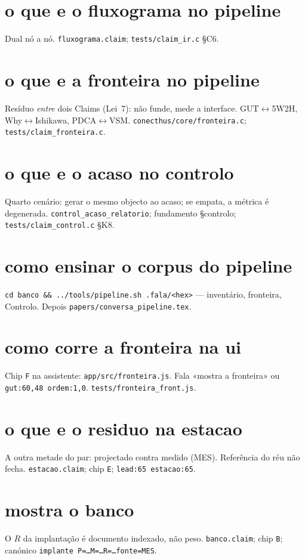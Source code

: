 \documentclass[11pt,a4paper]{article}
\newcommand{\code}[1]{\texttt{\small #1}}
\begin{document}
\section{o que e o fluxograma no pipeline}
Dual nó a nó. \code{fluxograma.claim}; \code{tests/claim\_ir.c} \S C6.

\section{o que e a fronteira no pipeline}
Resíduo \emph{entre} dois Claims (Lei~7): não funde, mede a interface.
GUT$\leftrightarrow$5W2H, Why$\leftrightarrow$Ishikawa, PDCA$\leftrightarrow$VSM.
\code{conecthus/core/fronteira.c}; \code{tests/claim\_fronteira.c}.

\section{o que e o acaso no controlo}
Quarto cenário: gerar o mesmo objecto ao acaso; se empata, a métrica é
degenerada. \code{control\_acaso\_relatorio}; fundamento \S controlo;
\code{tests/claim\_control.c} \S K8.

\section{como ensinar o corpus do pipeline}
\code{cd banco && ../tools/pipeline.sh .fala/<hex>} --- inventário, fronteira,
Controlo. Depois \code{papers/conversa\_pipeline.tex}.

\section{como corre a fronteira na ui}
Chip \code{F} na assistente: \code{app/src/fronteira.js}. Fala
«mostra a fronteira» ou \texttt{gut:60,48 ordem:1,0}.
\code{tests/fronteira\_front.js}.

\section{o que e o residuo na estacao}
A outra metade do par: projectado contra medido (MES). Referência do réu
não fecha. \code{estacao.claim}; chip \code{E}; \code{lead:65 estacao:65}.

\section{mostra o banco}
O $R$ da implantação é documento indexado, não peso.
\code{banco.claim}; chip \code{B}; canónico
\code{implante P=\ldots M=\ldots R=\ldots fonte=MES}.
\end{document}
